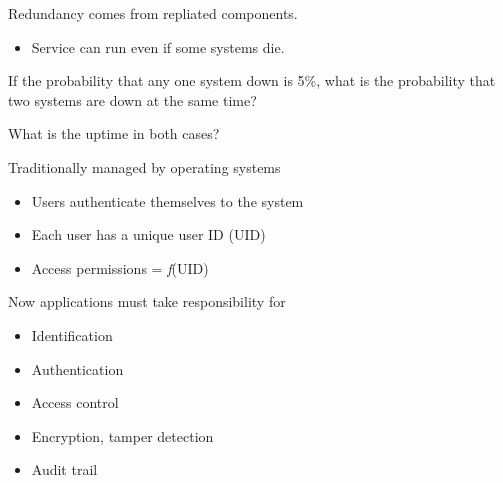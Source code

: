 \begin{slide}
	
	
	Redundancy comes from repliated components.
	\begin{itemize}
		\item Service can run even if some systems die.
	\end{itemize}
	\bigskip
	
	If the probability that any one system down is 5\%, what is the probability that two systems are down at the same time?
	\bigskip
	
	What is the uptime in both cases?
	
\end{slide}

\begin{slide}

	
	Traditionally managed by operating systems
	\begin{itemize}
		\item Users authenticate themselves to the system
		\item Each user has a unique user ID (UID)
		\item Access permissions = \textit{f}(UID)
	\end{itemize}
	\bigskip
	
	Now applications must take responsibility for
	\begin{itemize}
		\item Identification
		\item Authentication
		\item Access control
		\item Encryption, tamper detection
		\item Audit trail
	\end{itemize}
	
\end{slide}

